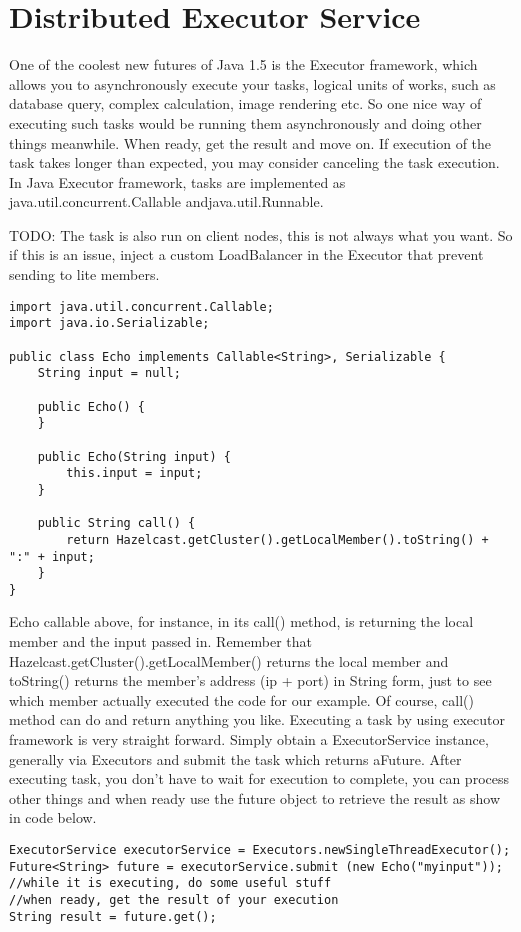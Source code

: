 \chapter{Distributed Executor Service}

One of the coolest new futures of Java 1.5 is the Executor framework, which allows you to asynchronously execute your tasks, logical units of works, such as database query, complex calculation, image rendering etc. So one nice way of executing such tasks would be running them asynchronously and doing other things meanwhile. When ready, get the result and move on. If execution of the task takes longer than expected, you may consider canceling the task execution. In Java Executor framework, tasks are implemented as java.util.concurrent.Callable andjava.util.Runnable.

TODO: The task is also run on client nodes, this is not always what you want. So if this is an issue, inject a custom LoadBalancer in the Executor that prevent sending to lite members.

\begin{verbatim}
import java.util.concurrent.Callable;
import java.io.Serializable;

public class Echo implements Callable<String>, Serializable {
    String input = null;

    public Echo() {
    }

    public Echo(String input) {
        this.input = input;
    }

    public String call() {
        return Hazelcast.getCluster().getLocalMember().toString() + ":" + input;
    }
}
\end{verbatim}

Echo callable above, for instance, in its call() method, is returning the local member and the input passed in. Remember that Hazelcast.getCluster().getLocalMember() returns the local member and toString() returns the member's address (ip + port) in String form, just to see which member actually executed the code for our example. Of course, call() method can do and return anything you like. Executing a task by using executor framework is very straight forward. Simply obtain a ExecutorService instance, generally via Executors and submit the task which returns aFuture. After executing task, you don't have to wait for execution to complete, you can process other things and when ready use the future object to retrieve the result as show in code below.

\begin{verbatim}
ExecutorService executorService = Executors.newSingleThreadExecutor();
Future<String> future = executorService.submit (new Echo("myinput"));
//while it is executing, do some useful stuff
//when ready, get the result of your execution
String result = future.get();
\end{verbatim}

